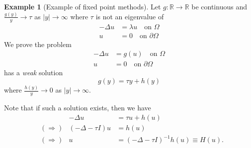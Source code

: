 \documentclass[10pt, oneside, reqno]{amsart}
\theoremstyle{plain}%
\numberwithin{equation}{section}
\theoremstyle{definition}
\newtheorem{exmp}[thm]{Example}
\theoremstyle{remark}
\newcommand{\R}{\mathbb{R}}
\begin{document}
\begin{exmp}[Example of fixed point methods]
	Let $g : \R \rightarrow \R$ be continuous and $\frac{g(y)}{y} \rightarrow \tau$ as $|y| \rightarrow \infty$ where $\tau$ is not an eigenvalue of \begin{align*}
		-\Delta u &= \lambda u \quad \text{on $\Omega$} \\
		u &= 0 \quad \text{on $\partial \Omega$}
	\end{align*}  We prove the problem \begin{align*}
		-\Delta u &= g(u) \quad \text{on $\Omega$} \\
		u &= 0 \quad \text{on $\partial \Omega$}
	\end{align*} has a \emph{weak} solution \[
		g(y) = \tau y + h(y) 
	\] where $\frac{h(y)}{y} \rightarrow 0$ as $|y| \rightarrow \infty$.  
	
	Note that if such a solution exists, then we have \begin{align*}
		& &- \Delta u &= \tau u + h(u) \\
		&(\Rightarrow) &(-\Delta - \tau I) u &= h(u) \\
		&(\Rightarrow) &u &= \left(-\Delta - \tau I \right)^{-1} h(u) \equiv H(u).
 	\end{align*}
\end{exmp}
\end{document}
